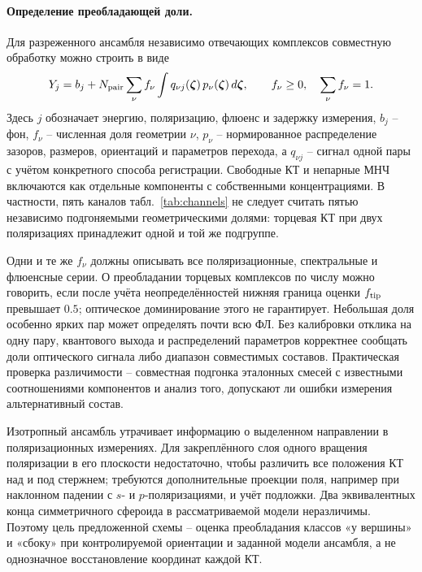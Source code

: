 \paragraph{Определение преобладающей доли.}
Для разреженного ансамбля независимо отвечающих комплексов совместную
обработку можно строить в виде
\begin{equation}
  Y_j=b_j+N_{\rm pair}\sum_\nu f_\nu
  \int q_{\nu j}(\boldsymbol\zeta)\,
              p_\nu(\boldsymbol\zeta)\,d\boldsymbol\zeta,
  \qquad f_\nu\ge0,\quad \sum_\nu f_\nu=1.
  \label{eq:ensemble-inference}
\end{equation}
Здесь $j$ обозначает энергию, поляризацию, флюенс и задержку измерения,
$b_j$ -- фон, $f_\nu$ -- численная доля геометрии $\nu$,
$p_\nu$ -- нормированное распределение зазоров, размеров, ориентаций
и параметров перехода, а $q_{\nu j}$ -- сигнал одной пары с учётом
конкретного способа регистрации. Свободные КТ и непарные МНЧ включаются
как отдельные компоненты с собственными концентрациями.
В частности, пять каналов табл.~\ref{tab:channels} не следует считать
пятью независимо подгоняемыми геометрическими долями: торцевая КТ
при двух поляризациях принадлежит одной и той же подгруппе.

Одни и те же $f_\nu$ должны описывать все поляризационные, спектральные
и флюенсные серии. О преобладании торцевых комплексов по числу можно
говорить, если после учёта неопределённостей нижняя граница оценки
$f_{\rm tip}$ превышает $0.5$; оптическое доминирование этого не гарантирует.
Небольшая доля особенно ярких пар может определять почти всю ФЛ.
Без калибровки отклика на одну пару, квантового выхода и распределений
параметров корректнее сообщать доли оптического сигнала либо диапазон
совместимых составов. Практическая проверка различимости -- совместная
подгонка эталонных смесей с известными соотношениями компонентов и анализ
того, допускают ли ошибки измерения альтернативный состав.

Изотропный ансамбль утрачивает информацию о выделенном направлении
в поляризационных измерениях. Для закреплённого слоя одного вращения
поляризации в его плоскости недостаточно, чтобы различить все положения
КТ над и под стержнем; требуются дополнительные проекции поля, например
при наклонном падении с $s$- и $p$-поляризациями, и учёт подложки.
Два эквивалентных конца симметричного сфероида в рассматриваемой модели
неразличимы. Поэтому цель предложенной схемы -- оценка преобладания
классов «у вершины» и «сбоку» при контролируемой ориентации и заданной
модели ансамбля, а не однозначное восстановление координат каждой КТ.

